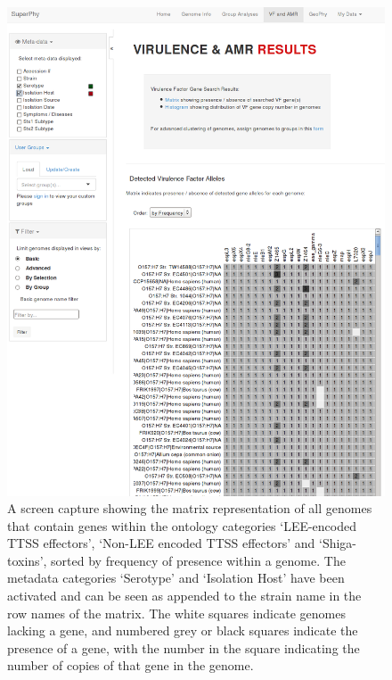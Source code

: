 \documentclass[doublespacing, linenumbers]{bmcart}
\begin{document}
\begin{backmatter}
\newpage
\begin{figure}[h!]
  \includegraphics[width=1\columnwidth]{images/vf_output.png}
  \caption{A screen capture showing the matrix representation of all genomes that contain genes within the ontology categories `LEE-encoded TTSS effectors', `Non-LEE encoded TTSS effectors' and `Shiga-toxins', sorted by frequency of presence within a genome. The metadata categories `Serotype' and `Isolation Host' have been activated and can be seen as appended to the strain name in the row names of the matrix. The white squares indicate genomes lacking a gene, and numbered grey or black squares indicate the presence of a gene, with the number in the square indicating the number of copies of that gene in the genome.}
  \label{fig:vf_output}
\end{figure}



\end{backmatter}
\end{document}
